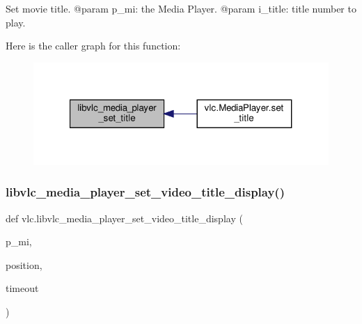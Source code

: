 \begin{DoxyVerb}Set movie title.
@param p_mi: the Media Player.
@param i_title: title number to play.
\end{DoxyVerb}
 Here is the caller graph for this function\+:
\nopagebreak
\begin{figure}[H]
\begin{center}
\leavevmode
\includegraphics[width=321pt]{namespacevlc_a046141b3f0caa945606a55fd49c07a7f_icgraph}
\end{center}
\end{figure}
\mbox{\label{namespacevlc_a9dd5dd28c47ef1630ebf1c9da682eed2}} 
\subsubsection{\texorpdfstring{libvlc\+\_\+media\+\_\+player\+\_\+set\+\_\+video\+\_\+title\+\_\+display()}{libvlc\_media\_player\_set\_video\_title\_display()}}
{\footnotesize\ttfamily def vlc.\+libvlc\+\_\+media\+\_\+player\+\_\+set\+\_\+video\+\_\+title\+\_\+display (\begin{DoxyParamCaption}\item[{}]{p\+\_\+mi,  }\item[{}]{position,  }\item[{}]{timeout }\end{DoxyParamCaption})}

